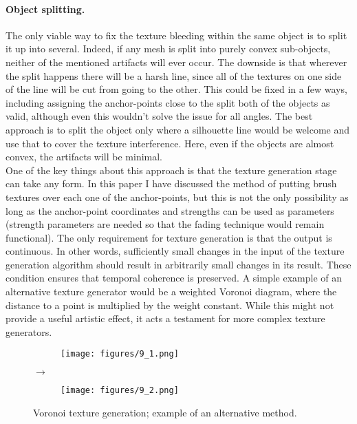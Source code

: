 \documentclass[a4paper,10pt]{article}
\begin{document}
\paragraph{Object splitting.}
The only viable way to fix the texture bleeding within the same object is to split it up into several. Indeed, if any mesh is split into purely convex sub-objects, neither of the mentioned artifacts will ever occur. The downside is that wherever the split happens there will be a harsh line, since all of the textures on one side of the line will be cut from going to the other. This could be fixed in a few ways, including assigning the anchor-points close to the split both of the objects as valid, although even this wouldn't solve the issue for all angles. The best approach is to split the object only where a silhouette line would be welcome and use that to cover the texture interference. Here, even if the objects are almost convex, the artifacts will be minimal.\\

One of the key things about this approach is that the texture generation stage can take any form. In this paper I have discussed the method of putting brush textures over each one of the anchor-points, but this is not the only possibility as long as the anchor-point coordinates and strengths can be used as parameters (strength parameters are needed so that the fading technique would remain functional). The only requirement for texture generation is that the output is continuous. In other words, sufficiently small changes in the input of the texture generation algorithm should result in arbitrarily small changes in its result. These condition ensures that temporal coherence is preserved. A simple example of an alternative texture generator would be a weighted Voronoi diagram, where the distance to a point is multiplied by the weight constant. While this might not provide a useful artistic effect, it acts a testament for more complex texture generators.

\begin{figure}[htbp!]
  \centering
  \begin{subfigure}{0.2\columnwidth}
    \texttt{[image: figures/9\_1.png]}
  \end{subfigure}%
  $\bm{\rightarrow}$%
  \begin{subfigure}{0.2\columnwidth}
    \texttt{[image: figures/9\_2.png]}
  \end{subfigure}
  \caption{Voronoi texture generation; example of an alternative method.}
\end{figure}
\end{document}
